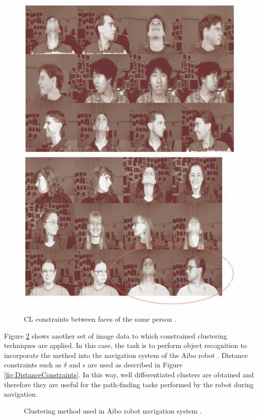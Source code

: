 \begin{figure}[bth]
	\myfloatalign
	{\includegraphics[width=.35\linewidth]{gfx/ConstClust/AnalisisImagenes/CarasDifOr1}} \quad
	{\includegraphics[width=.35\linewidth]{gfx/ConstClust/AnalisisImagenes/CarasDifOr2}}
	\caption[\acs{CL} constraints between faces of the same person.]{\acs{CL} constraints between faces of the same person \cite{davidson2007survey}.}\label{fig:FacesDatabaseCL}
\end{figure}

Figure \ref{fig:AiboRobotClustSys} shows another set of image data to which constrained clustering techniques are applied. In this case, the task is to perform object recognition to incorporate the method into the navigation system of the Aibo robot \cite{davidson2005clustering}. Distance constraints such as $\delta$ and $\epsilon$ are used as described in Figure \ref{fig:DistanceConstraints}. In this way, well differentiated clusters are obtained and therefore they are useful for the path-finding tasks performed by the robot during navigation.

\begin{figure}[bth]
	\myfloatalign
	 \quad
	 \quad
	 \quad
	\caption[Clustering method used in Aibo robot navigation system.]{Clustering method used in Aibo robot navigation system \cite{davidson2007survey,davidson2005clustering}.}\label{fig:AiboRobotClustSys}
\end{figure}

